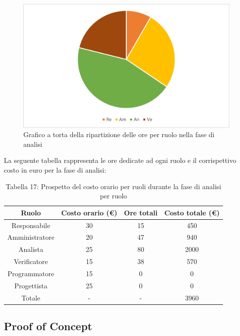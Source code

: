 \begin{figure}[H]
    \centering
    \includegraphics[scale=0.6]{img/grafi preventivo/torta/analisi/complessivo.png}
    \caption{Grafico a torta della ripartizione delle ore per ruolo nella fase di analisi}
\end{figure}
La seguente tabella rappresenta le ore dedicate ad ogni ruolo e il corrispettivo costo in euro per la fase di analisi:
\begin{table}[h]
	\setlength\extrarowheight{5pt}
	\centering
	\begin{tabularx}{\textwidth}{|ccc|c|}
		\hline
		\rowcolor{white}
		\textbf{Ruolo} & \textbf{Costo orario (€)} & \textbf{Ore totali} & \textbf{Costo totale (€)} \\
		\hline
		Responsabile &30&15&450 \\
		Amministratore &20&47&940 \\
		Analista &25&80&2000 \\
		Verificatore &15&38&570 \\
		Programmatore &15&0&0 \\
		Progettista &25&0&0 \\
		\hline
		Totale &-&-&3960 \\
		\hline
	\end{tabularx}
    \vspace{10pt}
	\caption{Tabella 17: Prospetto del costo orario per ruoli durante la fase di analisi per ruolo}
\end{table}
%
\subsection{Proof of Concept}

